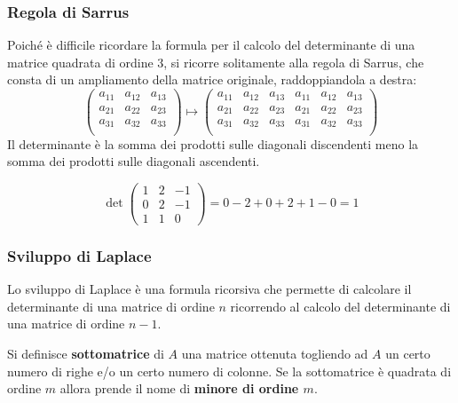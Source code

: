 \subsubsection*{Regola di Sarrus}
Poiché è difficile ricordare la formula per il calcolo del determinante di una matrice quadrata di ordine 3, si ricorre solitamente alla regola di Sarrus, che consta di un ampliamento della matrice originale, raddoppiandola a destra:
$$
  \begin{pmatrix}
    a_{11} & a_{12} & a_{13} \\
    a_{21} & a_{22} & a_{23} \\
    a_{31} & a_{32} & a_{33} \\
  \end{pmatrix}
  \mapsto 
  \begin{pmatrix}
    a_{11} & a_{12} & a_{13} & a_{11} & a_{12} & a_{13} \\
    a_{21} & a_{22} & a_{23} & a_{21} & a_{22} & a_{23} \\
    a_{31} & a_{32} & a_{33} & a_{31} & a_{32} & a_{33} \\
  \end{pmatrix}
$$
Il determinante è la somma dei prodotti sulle diagonali discendenti meno la somma dei prodotti sulle diagonali ascendenti.

\begin{example}
  $$
    \det
    \begin{pmatrix}
      1 & 2 & -1 \\
      0 & 2 & -1 \\
      1 & 1 & 0  
    \end{pmatrix}
    =0-2+0+2+1-0=1
  $$
\end{example}

\subsubsection*{Sviluppo di Laplace}
Lo sviluppo di Laplace è una formula ricorsiva che permette di calcolare il determinante di una matrice di ordine $n$ ricorrendo al calcolo del determinante di una matrice di ordine $n-1$.

\begin{definition}[Sottomatrice]
  Si definisce \textbf{sottomatrice} di $A$ una matrice ottenuta togliendo ad $A$ un certo numero di righe e/o un certo numero di colonne. Se la sottomatrice è quadrata di ordine $m$ allora prende il nome di \textbf{minore di ordine $m$}.
\end{definition}

